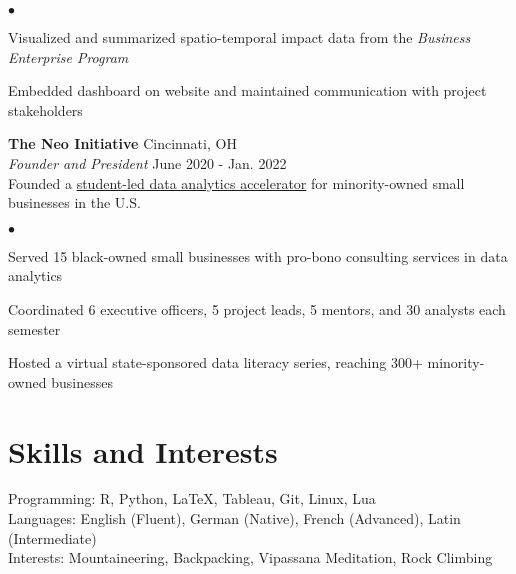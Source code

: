 \documentclass[margin,line, 10pt]{cv}
\newenvironment{list2}{
  \begin{list}{$\bullet$}{%
      \setlength{\itemsep}{0in}
      \setlength{\parsep}{0in} \setlength{\parskip}{0in}
      \setlength{\topsep}{0in} \setlength{\partopsep}{0in} 
      \setlength{\leftmargin}{0.2in}}}{\end{list}}
\begin{document}
\begin{resume}
\vspace*{.05in}  
\begin{list2}
\item Visualized and summarized spatio-temporal impact data from the \textit{Business Enterprise Program}
\item Embedded dashboard on website and maintained communication with project stakeholders
\end{list2}

{\bf The Neo Initiative} \hfill Cincinnati, OH\\ 
{\em Founder and President} \hfill {June 2020 - Jan. 2022}\\
Founded a \href{https://www.linkedin.com/company/neo-initiative/}{student-led data analytics accelerator} for minority-owned small businesses in the U.S. 

\vspace*{.05in}  
\begin{list2}
\item Served 15 black-owned small businesses with pro-bono consulting services in data analytics
\item Coordinated 6 executive officers, 5 project leads, 5 mentors, and 30 analysts each semester
\item Hosted a virtual state-sponsored data literacy series, reaching 300+ minority-owned businesses
\end{list2}

\section{\sc Skills and Interests} 
Programming: R, Python, \LaTeX, Tableau, Git, Linux, Lua\\
Languages: English (Fluent), German (Native), French (Advanced), Latin (Intermediate)\\
Interests: Mountaineering, Backpacking, Vipassana Meditation, Rock Climbing

\end{resume}
\thispagestyle{lastpage}
\end{document}
